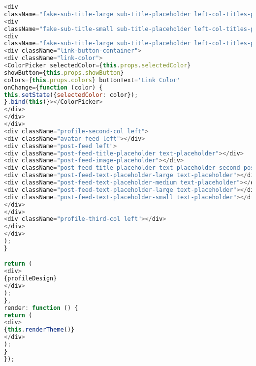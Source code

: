 \begin{lstlisting}[language=javascript]
<div
className="fake-sub-title-large sub-title-placeholder left-col-titles-placeholder second-paragraph"></div>
<div
className="fake-sub-title-small sub-title-placeholder left-col-titles-placeholder"></div>
<div
className="fake-sub-title-large sub-title-placeholder left-col-titles-placeholder"></div>
<div className="link-button-container">
<div className="link-color">
<ColorPicker selectedColor={this.props.selectedColor}
showButton={this.props.showButton}
colors={this.props.colors} buttonText='Link Color'
onChange={function (color) {
this.setState({selectedColor: color});
}.bind(this)}></ColorPicker>
</div>
</div>
</div>
<div className="profile-second-col left">
<div className="avatar-feed left"></div>
<div className="post-feed left">
<div className="post-feed-title-placeholder text-placeholder"></div>
<div className="post-feed-image-placeholder"></div>
<div className="post-feed-title-placeholder text-placeholder second-post"></div>
<div className="post-feed-text-placeholder-large text-placeholder"></div>
<div className="post-feed-text-placeholder-medium text-placeholder"></div>
<div className="post-feed-text-placeholder-large text-placeholder"></div>
<div className="post-feed-text-placeholder-small text-placeholder"></div>
</div>
</div>
<div className="profile-third-col left"></div>
</div>
</div>
);
}

return (
<div>
{profileDesign}
</div>
);
},
render: function () {
return (
<div>
{this.renderTheme()}
</div>
);
}
});
\end{lstlisting}
\fi